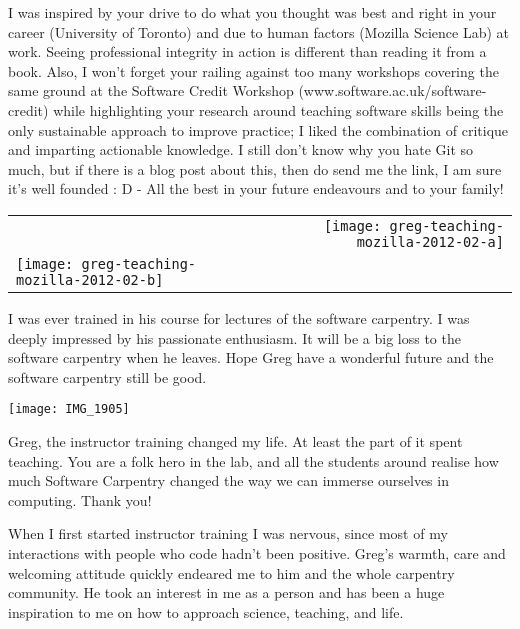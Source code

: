 I was inspired by your drive to do what you thought was best and right in your
career (University of Toronto) and due to human factors (Mozilla Science Lab)
at work. Seeing professional integrity in action is different than reading it
from a book. Also, I won't forget your railing against too many workshops
covering the same ground at the Software Credit Workshop
(www.software.ac.uk/software-credit) while highlighting your research around
teaching software skills being the only sustainable approach to improve
practice; I liked the combination of critique and imparting actionable
knowledge. I still don't know why you hate Git so much, but if there is a blog
post about this, then do send me the link, I am sure it's well founded  :  D  -
All the best in your future endeavours and to your family! 


\newpage

\begin{tabular*}{\textwidth}[t]{ l r }
    & \texttt{[image: greg-teaching-mozilla-2012-02-a]} \\
    \texttt{[image: greg-teaching-mozilla-2012-02-b]} & \\
\end{tabular*}

I was ever trained in his course for lectures of the software carpentry. I was
deeply impressed by his passionate enthusiasm. It will be a big loss to the
software carpentry when he leaves. Hope Greg have a wonderful future and the
software carpentry still be good.


\newpage

\newpage

\begin{center}
\texttt{[image: IMG\_1905]}
\end{center}

Greg, the instructor training changed my life. At least the part of it spent
teaching. You are a folk hero in the lab, and all the students around realise
how much Software Carpentry changed the way we can immerse ourselves in
computing. Thank you!


\newpage

When I first started instructor training I was nervous, since most of my
interactions with people who code hadn't been positive. Greg's warmth, care and
welcoming attitude quickly endeared me to him and the whole carpentry
community. He took an interest in me as a person and has been a huge
inspiration to me on how to approach science, teaching, and life. 

